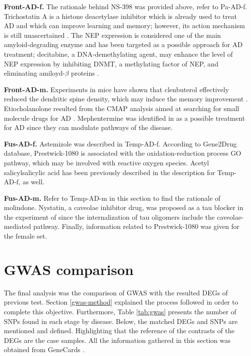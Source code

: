 \textbf{Front-AD-f.} The rationale behind NS-398 was provided above, refer to Pa-AD-f. Trichostatin A is a histone deacetylase inhibitor which is already used to treat AD and which can improve learning and memory; however, its action mechanism is still unascertained \cite{li20}. The NEP expression is considered one of the main amyloid-degrading enzyme and has been targeted as a possible approach for AD treatment; decitabine, a DNA-demethylating agent, may enhance the level of NEP expression by inhibiting DNMT, a methylating factor of NEP, and eliminating amiloyd-$\beta$ proteins \cite{zhu2015}.

\textbf{Front-AD-m.} Experiments in mice have shown that clenbuterol effectively reduced the dendritic spine density, which may induce the memory improvement \cite{chai2016}. Etiocholanolone resulted from the CMAP analysis aimed at searching for small molecule drugs for AD \cite{wang2020}. Mephentermine was identified in \cite{cohen} as a possible treatment for AD since they can modulate pathways of the disease.

\textbf{Fus-AD-f.} Astemizole was described in Temp-AD-f. According to Gene2Drug \cite{gene2drug} database, Prestwick-1080 is associated with the oxidation-reduction process GO pathway, which may be involved with reactive oxygen species. Acetyl salicylsalicylic acid has been previously described in the description for Temp-AD-f, as well.

\textbf{Fus-AD-m.} Refer to Temp-AD-m in this section to find the rationale of molindone. Nystatin, a caveolae inhibitor drug, was proposed as a tau blocker in the experiment of \cite{puangmalai} since the internalization of tau oligomers include the caveolae-mediated pathway. Finally, information related to Prestwick-1080 was given for the female set.

\section{GWAS comparison}
\sloppy
The final analysis was the comparison of GWAS with the resulted DEGs of previous test. Section \ref{gwas-method} explained the process followed in order to complete this objective. Furthermore, Table \ref{tab:gwas} presents the number of SNPs found in each stage by disease. Below, the matched DEGs and SNPs are mentioned and defined. Highlighting that the reference of the contrasts of the DEGs are the case samples. All the information gathered in this section was obtained from GeneCards \cite{genecards}.

